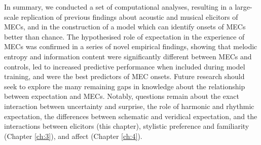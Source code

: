In summary, we conducted a set of computational analyses, resulting in a large-scale replication of previous findings about acoustic and musical elicitors of MECs, and in the construction of a model which can identify onsets of MECs better than chance. The hypothesised role of expectation in the experience of MECs was confirmed in a series of novel empirical findings, showing that melodic entropy and information content were significantly different between MECs and controls, led to increased predictive performance when included during model training, and were the best predictors of MEC onsets. Future research should seek to explore the many remaining gaps in knowledge about the relationship between expectation and MECs. Notably, questions remain about the exact interaction between uncertainty and surprise, the role of harmonic and rhythmic expectation, the differences between schematic and veridical expectation, and the interactions between elicitors (this chapter), stylistic preference and familiarity (Chapter \ref{ch:3}), and affect (Chapter \ref{ch:4}).
